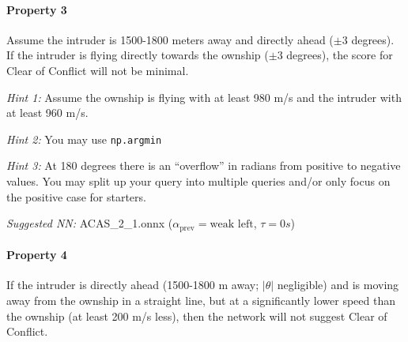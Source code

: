 \documentclass[11pt,fleqn]{article}
\begin{document}


\paragraph*{Property 3}
Assume the intruder is 1500-1800 meters away and directly ahead ($\pm 3$ degrees).
If the intruder is flying directly towards the ownship ($\pm 3$ degrees),
the score for Clear of Conflict will not be minimal.

\textit{Hint 1:} Assume the ownship is flying with at least 980 m/s and the intruder with at least 960 m/s.

\textit{Hint 2:} You may use \texttt{np.argmin}

\textit{Hint 3:} At 180 degrees there is an ``overflow'' in radians from positive to negative values.
You may split up your query into multiple queries and/or only focus on the positive case for starters.

\textit{Suggested NN:} ACAS\_2\_1.onnx ($\alpha_{\text{prev}}=\text{weak left}$, $\tau=0s$)


\paragraph*{Property 4}
If the intruder is directly ahead (1500-1800 m away; $\left|\theta\right|$ negligible) and is moving away from the ownship in a straight line, but at a significantly lower speed than the ownship (at least 200 m/s less), then the network will not suggest Clear of Conflict.
\end{document}
